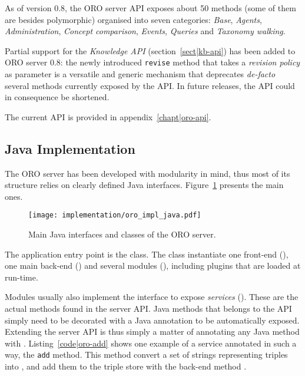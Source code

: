 As of version 0.8, the ORO server API exposes about 50 methods (some of them
are besides polymorphic) organised into seven categories: \emph{Base}, \emph{Agents},
\emph{Administration}, \emph{Concept comparison}, \emph{Events}, \emph{Queries}
and \emph{Taxonomy walking}.

Partial support for the \emph{Knowledge API} (section~\ref{sect|kb-api}) has
been added to ORO server 0.8: the newly introduced {\tt revise} method that
takes a \emph{revision policy} as parameter is a versatile and generic
mechanism that deprecates {\it de-facto} several methods currently exposed by
the API. In future releases, the API could in consequence be shortened.

The current API is provided in appendix~\ref{chapt|oro-api}.

\subsection{Java Implementation}
\label{sect|java-impl}

The ORO server has been developed with modularity in mind, thus most of its
structure relies on clearly defined Java interfaces.
Figure~\ref{fig|oro-impl-java} presents the main ones.

\begin{figure}
    \centering
    \texttt{[image: implementation/oro\_impl\_java.pdf]}
    \caption{Main Java interfaces and classes of the ORO server.}
    \label{fig|oro-impl-java}
\end{figure}

The application entry point is the  class. The class
instantiate one front-end (), one main back-end
() and several modules (),
including plugins that are loaded at run-time.

Modules usually also implement the  interface to
expose \emph{services} (). These are the actual methods found
in the server API. Java methods that belongs to the API simply need to be
decorated with a  Java annotation to be automatically
exposed. Extending the server API is thus simply a matter of annotating any
Java method with . Listing~\ref{code|oro-add} shows one
example of a service annotated in such a way, the {\tt add} method. This method
convert a set of strings representing triples into , 
and add them to the triple store with the back-end method .

